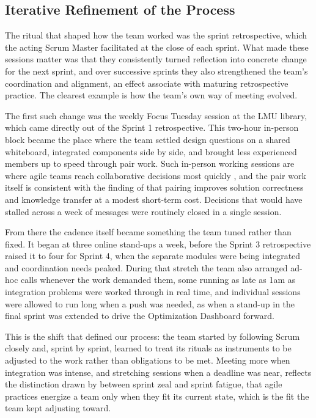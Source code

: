 \subsection{Iterative Refinement of the Process}\label{sec:process-refinement}

The ritual that shaped how the team worked was the sprint retrospective, which the acting Scrum Master facilitated at the close of each sprint. What made these sessions matter was that they consistently turned reflection into concrete change for the next sprint, and over successive sprints they also strengthened the team's coordination and alignment, an effect \textcite{spiegler2018leadership} associate with maturing retrospective practice. The clearest example is how the team's own way of meeting evolved.

The first such change was the weekly Focus Tuesday session at the LMU library, which came directly out of the Sprint 1 retrospective. This two-hour in-person block became the place where the team settled design questions on a shared whiteboard, integrated components side by side, and brought less experienced members up to speed through pair work. Such in-person working sessions are where agile teams reach collaborative decisions most quickly \autocite{moe2012shared}, and the pair work itself is consistent with the finding of \textcite{hannay2009pair} that pairing improves solution correctness and knowledge transfer at a modest short-term cost. Decisions that would have stalled across a week of messages were routinely closed in a single session.

From there the cadence itself became something the team tuned rather than fixed. It began at three online stand-ups a week, before the Sprint 3 retrospective raised it to four for Sprint 4, when the separate modules were being integrated and coordination needs peaked. During that stretch the team also arranged ad-hoc calls whenever the work demanded them, some running as late as 1am as integration problems were worked through in real time, and individual sessions were allowed to run long when a push was needed, as when a stand-up in the final sprint was extended to drive the Optimization Dashboard forward.

This is the shift that defined our process: the team started by following Scrum closely and, sprint by sprint, learned to treat its rituals as instruments to be adjusted to the work rather than obligations to be met. Meeting more when integration was intense, and stretching sessions when a deadline was near, reflects the distinction drawn by \textcite{benlian2021sprint} between sprint zeal and sprint fatigue, that agile practices energize a team only when they fit its current state, which is the fit the team kept adjusting toward.
